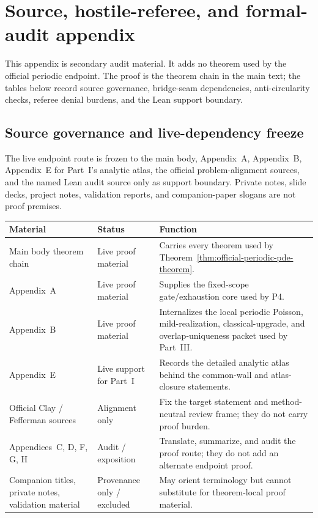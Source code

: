 \clearpage
\section{Source, hostile-referee, and formal-audit appendix}\label{sec:internal-ledger}
This appendix is secondary audit material. It adds no theorem used by the official periodic endpoint. The proof is the theorem chain in the main text; the tables below record source governance, bridge-seam dependencies, anti-circularity checks, referee denial burdens, and the Lean support boundary.

\subsection{Source governance and live-dependency freeze}\label{sec:source-governance-live-freeze}
The live endpoint route is frozen to the main body, Appendix~A, Appendix~B, Appendix~E for Part~I's analytic atlas, the official problem-alignment sources, and the named Lean audit source only as support boundary. Private notes, slide decks, project notes, validation reports, and companion-paper slogans are not proof premises.

\begin{center}
\footnotesize
\renewcommand{\arraystretch}{1.14}
\setlength{\tabcolsep}{4pt}
\begin{tabularx}{0.98\textwidth}{@{}L{0.30\textwidth}L{0.22\textwidth}Y@{}}
\toprule
\textbf{Material} & \textbf{Status} & \textbf{Function}\\
\midrule
Main body theorem chain & Live proof material & Carries every theorem used by Theorem~\ref{thm:official-periodic-pde-theorem}.\\
Appendix~A & Live proof material & Supplies the fixed-scope gate/exhaustion core used by P4.\\
Appendix~B & Live proof material & Internalizes the local periodic Poisson, mild-realization, classical-upgrade, and overlap-uniqueness packet used by Part~III.\\
Appendix~E & Live support for Part~I & Records the detailed analytic atlas behind the common-wall and atlas-closure statements.\\
Official Clay / Fefferman sources & Alignment only & Fix the target statement and method-neutral review frame; they do not carry proof burden.\\
Appendices~C, D, F, G, H & Audit / exposition & Translate, summarize, and audit the proof route; they do not add an alternate endpoint proof.\\
Companion titles, private notes, validation material & Provenance only / excluded & May orient terminology but cannot substitute for theorem-local proof material.\\
\bottomrule
\end{tabularx}
\end{center}


